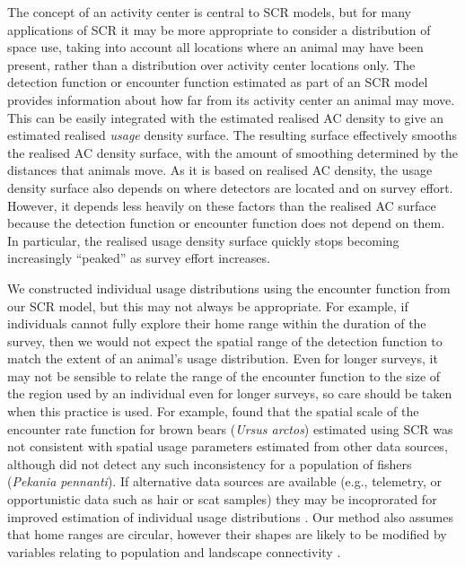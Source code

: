 \documentclass[10pt,a4paper]{article}
\begin{document}
The concept of an activity center is central to SCR models, but for many applications of SCR it may be more appropriate to consider a distribution of space use, taking into account all locations where an animal may have been present, rather than a distribution over activity center locations only. The detection function or encounter function estimated as part of an SCR model provides information about how far from its activity center an animal may move. This can be easily integrated with the estimated realised AC density to give an estimated realised {\it usage} density surface. The resulting surface effectively smooths the realised AC density surface, with the amount of smoothing determined by the distances that animals move. As it is based on realised AC density, the usage density surface also depends on where detectors are located and on survey effort. However, it depends less heavily on these factors than the realised AC surface because the detection function or encounter function does not depend on them. In particular, the realised usage density surface quickly stops becoming increasingly ``peaked'' as survey effort increases.

We constructed individual usage distributions using the encounter function from our SCR model, but this may not always be
appropriate. For example, if individuals cannot fully explore their home range within the duration of the survey, then we would not expect the spatial range of the detection function to match the extent of an animal's usage distribution. Even for longer surveys, it may not be sensible to relate the range of the encounter function to the size of the region used by an individual even for longer surveys, so care should be taken when this practice is used. For example, \cite{Tenan+al:17} found that the spatial scale of the encounter rate function for brown bears (\emph{Ursus arctos}) estimated using SCR was not consistent with spatial usage parameters estimated from other data sources, although \cite{Popescu+al:14} did not detect any such inconsistency for a population of fishers (\emph{Pekania pennanti}). If alternative data sources are available (e.g., telemetry, or opportunistic data such as hair or scat samples) they may be incoprorated for improved estimation of individual usage distributions \citep{Tenan+al:17}. Our method also assumes that home ranges are circular, however their shapes are likely to be modified by variables relating to population and landscape connectivity \citep[see][for a review]{Drake+al:ip}.
\end{document}
